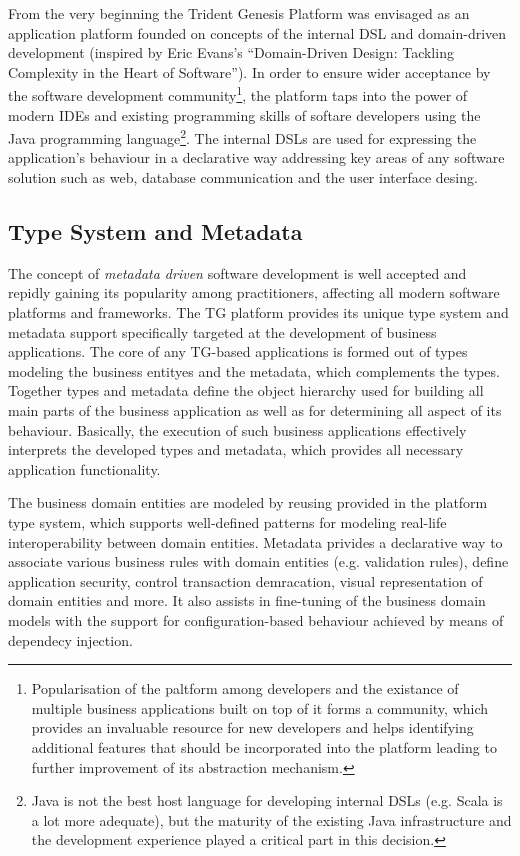   From the very beginning the Trident Genesis Platform was envisaged as an application platform founded on concepts of the internal DSL and domain-driven development (inspired by Eric Evans's ``Domain-Driven Design: Tackling Complexity in the Heart of Software'').
  In order to ensure wider acceptance by the software development community\footnote{Popularisation of the paltform among developers and the existance of multiple business applications built on top of it forms a community, which provides an invaluable resource for new developers and helps identifying additional features that should be incorporated into the platform leading to further improvement of its abstraction mechanism.}, the platform taps into the power of modern IDEs and existing programming skills of softare developers using the Java programming language\footnote{Java is not the best host language for developing internal DSLs (e.g. Scala is a lot more adequate), but the maturity of the existing Java infrastructure and the development experience played a critical part in this decision.}.
  The internal DSLs are used for expressing the application's behaviour in a declarative way addressing key areas of any software solution such as web, database communication and the user interface desing.

\subsection{Type System and Metadata}
  The concept of \emph{metadata driven} software development is well accepted and repidly gaining its popularity among practitioners, affecting all modern software platforms and frameworks.
  The TG platform provides its unique type system and metadata support specifically targeted at the development of business applications.
  The core of any TG-based applications is formed out of types modeling the business entityes and the metadata, which complements the types.
  Together types and metadata define the object hierarchy used for building all main parts of the business application as well as for determining all aspect of its behaviour.
  Basically, the execution of such business applications effectively interprets the developed types and metadata, which provides all necessary application functionality.

  The business domain entities are modeled by reusing provided in the platform type system, which supports well-defined patterns for modeling real-life interoperability between domain entities.  
  Metadata privides a declarative way to associate various business rules with domain entities (e.g. validation rules), define application security, control transaction demracation, visual representation of domain entities and more.
  It also assists in fine-tuning of the business domain models with the support for configuration-based behaviour achieved by means of dependecy injection.
  
